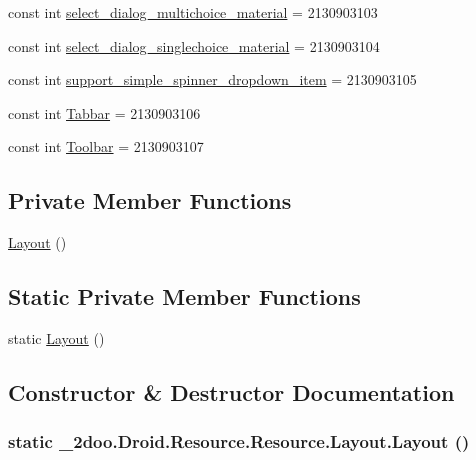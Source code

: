 \begin{CompactItemize}
\item 
const int \hyperlink{class__2doo_1_1_droid_1_1_resource_1_1_layout_346ae0e0979d35b3b35da8fbf319c76a}{select\_\-dialog\_\-multichoice\_\-material} = 2130903103
\item 
const int \hyperlink{class__2doo_1_1_droid_1_1_resource_1_1_layout_00f313e1f1674d257d99018ab01e5407}{select\_\-dialog\_\-singlechoice\_\-material} = 2130903104
\item 
const int \hyperlink{class__2doo_1_1_droid_1_1_resource_1_1_layout_7c6b12e6ecf6e5ba07ee0eb2de339a34}{support\_\-simple\_\-spinner\_\-dropdown\_\-item} = 2130903105
\item 
const int \hyperlink{class__2doo_1_1_droid_1_1_resource_1_1_layout_1be33252c37a056f72bcadd5f1ac93b0}{Tabbar} = 2130903106
\item 
const int \hyperlink{class__2doo_1_1_droid_1_1_resource_1_1_layout_1c65e79d914035124f83486c77e12e1f}{Toolbar} = 2130903107
\end{CompactItemize}
\subsection*{Private Member Functions}
\begin{CompactItemize}
\item 
\hyperlink{class__2doo_1_1_droid_1_1_resource_1_1_layout_336828bd1d1888bd39689e9f341fa4f6}{Layout} ()
\end{CompactItemize}
\subsection*{Static Private Member Functions}
\begin{CompactItemize}
\item 
static \hyperlink{class__2doo_1_1_droid_1_1_resource_1_1_layout_63e903ab3c4d111a2506453388fc14ad}{Layout} ()
\end{CompactItemize}


\subsection{Constructor \& Destructor Documentation}
\hypertarget{class__2doo_1_1_droid_1_1_resource_1_1_layout_63e903ab3c4d111a2506453388fc14ad}{
\subsubsection[{Layout}]{\setlength{\rightskip}{0pt plus 5cm}static \_\-2doo.Droid.Resource.Resource.Layout.Layout ()}}
\label{class__2doo_1_1_droid_1_1_resource_1_1_layout_63e903ab3c4d111a2506453388fc14ad}


